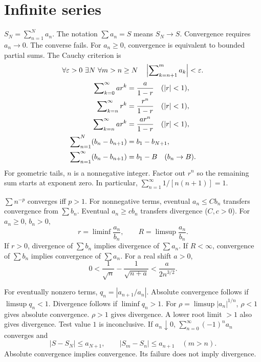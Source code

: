 \section{Infinite series}
\label{sec:appendix:formula-sheet-series}
$S_N=\sum_{n=1}^N a_n$. The notation $\sum a_n=S$ means $S_N\to S$.
Convergence requires $a_n\to0$. The converse fails.
For $a_n\ge0$, convergence is equivalent to bounded partial sums.
The Cauchy criterion is
\[
  \forall\varepsilon>0\ \exists N\ \forall m>n\ge N\quad
    \left|\sheetsum_{k=n+1}^m a_k\right|<\varepsilon.
\]
\[
  \begin{aligned}
    \sum\nolimits_{k=0}^\infty ar^k&=\frac a{1-r}\quad(|r|<1),\\
    \sum\nolimits_{k=n}^\infty r^k&=\frac{r^n}{1-r}\quad(|r|<1),\\
    \sum\nolimits_{k=n}^\infty ar^k&=\frac{ar^n}{1-r}\quad(|r|<1),\\
    \sum\nolimits_{n=1}^N(b_n-b_{n+1})&=b_1-b_{N+1},\\
    \sum\nolimits_{n=1}^\infty(b_n-b_{n+1})&=b_1-B\quad(b_n\to B).
  \end{aligned}
\]
For geometric tails, $n$ is a nonnegative integer.
Factor out $r^n$ so the remaining sum starts at exponent zero.
In particular, $\sum_{n=1}^\infty1/[n(n+1)]=1$.

$\sum n^{-p}$ converges iff $p>1$.
For nonnegative terms, eventual $a_n\le Cb_n$ transfers convergence
from $\sum b_n$. Eventual $a_n\ge cb_n$ transfers divergence
($C,c>0$).
For $a_n\ge0$, $b_n>0$,
\[
  r=\liminf\frac{a_n}{b_n},\qquad R=\limsup\frac{a_n}{b_n}.
\]
If $r>0$, divergence of $\sum b_n$ implies divergence of $\sum a_n$.
If $R<\infty$, convergence of $\sum b_n$ implies convergence of $\sum a_n$.
For a real shift $a>0$,
\[
  0<\frac1{\sqrt n}-\frac1{\sqrt{n+a}}<\frac{a}{2n^{3/2}}.
\]

For eventually nonzero terms, $q_n=|a_{n+1}/a_n|$.
Absolute convergence follows if $\limsup q_n<1$.
Divergence follows if $\liminf q_n>1$.
For $\rho=\limsup|a_n|^{1/n}$, $\rho<1$ gives absolute convergence.
$\rho>1$ gives divergence. A lower root limit $>1$ also gives divergence.
Test value $1$ is inconclusive.
If $a_n\downarrow0$, $\sum_{n=0}^\infty(-1)^n a_n$ converges and
\[
  |S-S_N|\le a_{N+1},\qquad |S_m-S_n|\le a_{n+1}\quad(m>n).
\]
Absolute convergence implies convergence. Its failure does not imply divergence.
